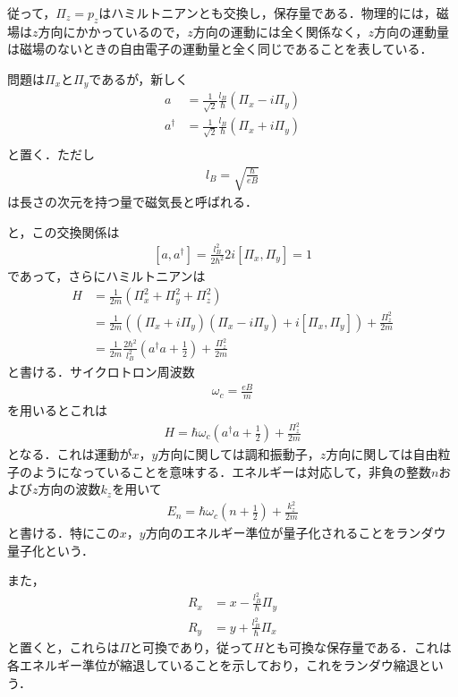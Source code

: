 \documentclass[a4j]{jarticle}
\begin{document}
従って，$\Pi_z=p_z$はハミルトニアンとも交換し，保存量である．物理的には，磁場は$z$方向にかかっているので，$z$方向の運動には全く関係なく，$z$方向の運動量は磁場のないときの自由電子の運動量と全く同じであることを表している．

問題は$\Pi_x$と$\Pi_y$であるが，新しく
\begin{align*}
 a&=\frac{1}{\sqrt{2}}\frac{l_B}{\hbar}\left(\Pi_x-i\Pi_y\right) \\
 a^{\dagger}&=\frac{1}{\sqrt{2}}\frac{l_B}{\hbar}\left(\Pi_x+i\Pi_y\right) \\
\end{align*}
と置く．ただし
\begin{align*}
 l_B=\sqrt{\frac{\hbar}{eB}}
\end{align*}
は長さの次元を持つ量で磁気長と呼ばれる．

と，この交換関係は
\begin{align*}
 \left[a,a^{\dagger}\right]=\frac{l_B^2}{2\hbar^2}2i\left[\Pi_x,\Pi_y\right]=1
\end{align*}
であって，さらにハミルトニアンは
\begin{align*}
 H&=\frac{1}{2m}\left(\Pi_x^2+\Pi_y^2+\Pi_z^2\right) \\
&=\frac{1}{2m}\left((\Pi_x+i\Pi_y)(\Pi_x-i\Pi_y)+i\left[\Pi_x,\Pi_y\right]\right)+\frac{\Pi_z^2}{2m} \\
&=\frac{1}{2m}\frac{2\hbar^2}{l_B^2}\left(a^{\dagger}a+\frac{1}{2}\right)+\frac{\Pi_z^2}{2m} 
\end{align*}
と書ける．サイクロトロン周波数
\begin{align*}
 \omega_c=\frac{eB}{m}
\end{align*}
を用いるとこれは
\begin{align*}
 H=\hbar\omega_c\left(a^{\dagger}a+\frac{1}{2}\right)+\frac{\Pi_z^2}{2m}
\end{align*}
となる．これは運動が$x$，$y$方向に関しては調和振動子，$z$方向に関しては自由粒子のようになっていることを意味する．エネルギーは対応して，非負の整数$n$および$z$方向の波数$k_z$を用いて
 \begin{align*}
  E_n=\hbar\omega_c\left(n+\frac{1}{2}\right)+\frac{k_z^2}{2m}
 \end{align*}
と書ける．特にこの$x$，$y$方向のエネルギー準位が量子化されることをランダウ量子化という．

また，
\begin{align*}
 R_x&=x-\frac{l_B^2}{\hbar}\Pi_y \\
 R_y&=y+\frac{l_B^2}{\hbar}\Pi_x 
\end{align*}
と置くと，これらは$\Pi$と可換であり，従って$H$とも可換な保存量である．これは各エネルギー準位が縮退していることを示しており，これをランダウ縮退という．
\end{document}
